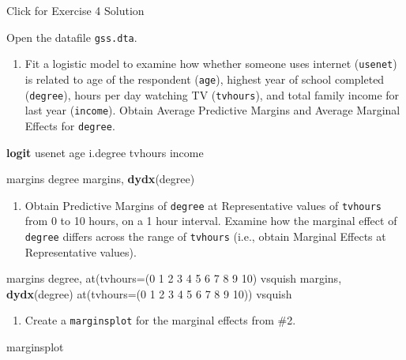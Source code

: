 \documentclass[
]{book}
\newenvironment{Shaded}{\begin{snugshade}}{\end{snugshade}}
\newcommand{\FunctionTok}[1]{\textcolor[rgb]{0.00,0.00,0.00}{#1}}
\newcommand{\KeywordTok}[1]{\textcolor[rgb]{0.13,0.29,0.53}{\textbf{#1}}}
\newcommand{\NormalTok}[1]{#1}
\providecommand{\tightlist}{%
  \setlength{\itemsep}{0pt}\setlength{\parskip}{0pt}}
\begin{document}
{Click for Exercise 4 Solution}

\begin{alert}

Open the datafile \texttt{gss.dta}.

\begin{enumerate}
\def\labelenumi{\arabic{enumi}.}
\tightlist
\item
  Fit a logistic model to examine how whether someone uses internet (\texttt{usenet}) is related to age of the respondent (\texttt{age}), highest year of school completed (\texttt{degree}), hours per day watching TV (\texttt{tvhours}), and total family income for last year (\texttt{income}). Obtain Average Predictive Margins and Average Marginal Effects for \texttt{degree}.
\end{enumerate}

\begin{Shaded}
\begin{Highlighting}[]
\KeywordTok{logit}\NormalTok{ usenet age i.degree tvhours income }

\NormalTok{margins degree}
\NormalTok{margins, }\KeywordTok{dydx}\NormalTok{(degree)}
\end{Highlighting}
\end{Shaded}

\begin{enumerate}
\def\labelenumi{\arabic{enumi}.}
\setcounter{enumi}{1}
\tightlist
\item
  Obtain Predictive Margins of \texttt{degree} at Representative values of \texttt{tvhours} from 0 to 10 hours, on a 1 hour interval. Examine how the marginal effect of \texttt{degree} differs across the range of \texttt{tvhours} (i.e., obtain Marginal Effects at Representative values).
\end{enumerate}

\begin{Shaded}
\begin{Highlighting}[]
\NormalTok{margins degree, }\FunctionTok{at}\NormalTok{(tvhours=(0 1 2 3 4 5 6 7 8 9 10) vsquish }
\NormalTok{margins, }\KeywordTok{dydx}\NormalTok{(degree) }\FunctionTok{at}\NormalTok{(tvhours=(0 1 2 3 4 5 6 7 8 9 10)) vsquish }
\end{Highlighting}
\end{Shaded}

\begin{enumerate}
\def\labelenumi{\arabic{enumi}.}
\setcounter{enumi}{2}
\tightlist
\item
  Create a \texttt{marginsplot} for the marginal effects from \#2.
\end{enumerate}

\begin{Shaded}
\begin{Highlighting}[]
\NormalTok{marginsplot}
\end{Highlighting}
\end{Shaded}

\end{alert}
\end{document}
